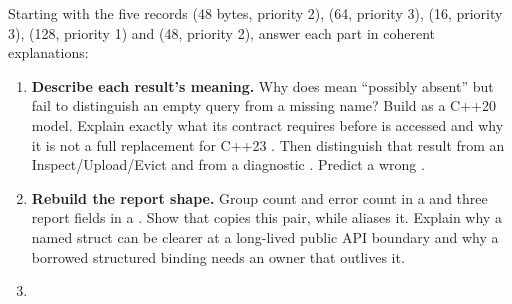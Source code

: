 
Starting with the five records  (48 bytes, priority 2),  (64, priority 3),  (16, priority 3),  (128, priority 1) and  (48, priority 2), answer each part in coherent explanations:

\begin{enumerate}
\def\labelenumi{\arabic{enumi}.}
\item
  \textbf{Describe each result's meaning.} Why does  mean ``possibly absent'' but fail to distinguish an empty query from a missing name? Build  as a C++20 model. Explain exactly what its  contract requires before  is accessed and why it is not a full replacement for C++23 . Then distinguish that result from an Inspect/Upload/Evict  and from a diagnostic . Predict a wrong .
\item
  \textbf{Rebuild the report shape.} Group count and error count in a  and three report fields in a . Show that  copies this pair, while  aliases it. Explain why a named struct can be clearer at a long-lived public API boundary and why a borrowed structured binding needs an owner that outlives it.
\item

\end{enumerate}
